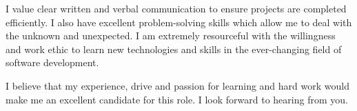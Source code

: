 \documentclass[11pt,a4paper,sans]{moderncv}        %
\newcommand{\company}{The Creative Group}
\newcommand{\company}{Science 37}
\begin{document}

I value clear written and verbal communication to ensure projects are completed efficiently. 
I also have excellent problem-solving skills which allow me to deal with the unknown and unexpected. 
I am extremely resourceful with the willingness and work ethic to learn new technologies and skills in the ever-changing field of software development.

I believe that my experience, drive and passion for learning and hard work would make me an excellent candidate for this role.
I look forward to hearing from you.

\makeletterclosing
\end{document}
